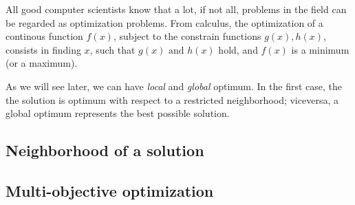 \documentclass{subfiles}
\begin{document}
    All good computer scientists know that a lot, 
        if not all, problems in the field can be regarded as optimization problems.
        From calculus, the optimization of a continous function $f(x)$,
        subject to the constrain functions $g(x), h(x)$,
        consists in finding $x$, such that $g(x) \text{ and } h(x)$ hold,
        and $f(x)$ is a minimum (or a maximum).

    As we will see later, we can have \emph{local} and \emph{global} optimum.
        In the first case, the the solution is optimum with respect to a restricted neighborhood;
        viceversa, a global optimum represents the best possible solution.

    \subsection{Neighborhood of a solution}
    

    \subsection{Multi-objective optimization}
    
\end{document}
